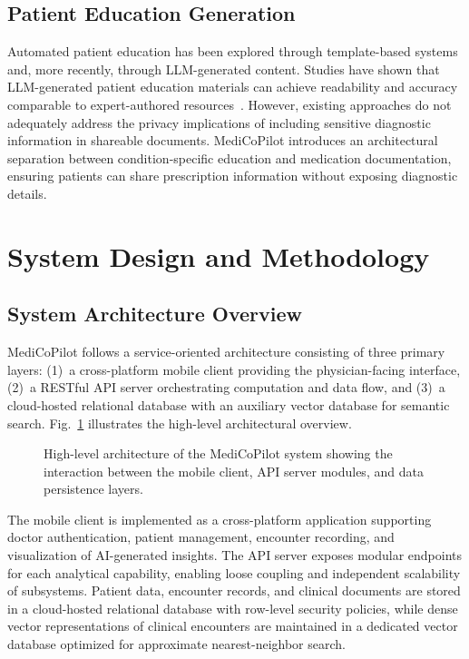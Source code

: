 \documentclass[conference]{IEEEtran}
\begin{document}
\subsection{Patient Education Generation}
Automated patient education has been explored through template-based systems and, more recently, through LLM-generated content. Studies have shown that LLM-generated patient education materials can achieve readability and accuracy comparable to expert-authored resources~\cite{b15}. However, existing approaches do not adequately address the privacy implications of including sensitive diagnostic information in shareable documents. MediCoPilot introduces an architectural separation between condition-specific education and medication documentation, ensuring patients can share prescription information without exposing diagnostic details.


\section{System Design and Methodology}
\label{sec:methodology}

\subsection{System Architecture Overview}

MediCoPilot follows a service-oriented architecture consisting of three primary layers: (1)~a cross-platform mobile client providing the physician-facing interface, (2)~a RESTful API server orchestrating computation and data flow, and (3)~a cloud-hosted relational database with an auxiliary vector database for semantic search. Fig.~\ref{fig:architecture} illustrates the high-level architectural overview.

\begin{figure}[htbp]
\centering
{}
\caption{High-level architecture of the MediCoPilot system showing the interaction between the mobile client, API server modules, and data persistence layers.}
\label{fig:architecture}
\end{figure}

The mobile client is implemented as a cross-platform application supporting doctor authentication, patient management, encounter recording, and visualization of AI-generated insights. The API server exposes modular endpoints for each analytical capability, enabling loose coupling and independent scalability of subsystems. Patient data, encounter records, and clinical documents are stored in a cloud-hosted relational database with row-level security policies, while dense vector representations of clinical encounters are maintained in a dedicated vector database optimized for approximate nearest-neighbor search.
\end{document}
